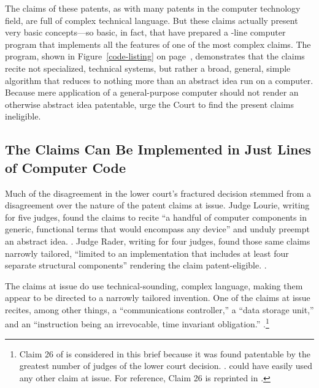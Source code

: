 \documentclass{scotus}
\begin{document}
The claims of these patents, as with many patents in the computer technology
field, are full of complex technical language.
But these claims actually present very basic concepts---so basic, in fact, that
\amici have prepared a \numlines-line computer program
that implements all the features of one of the most complex claims. The program,
shown in Figure~\ref{code-listing} on page~\pageref{code-listing},
demonstrates that the claims recite not specialized, technical systems, but
rather a broad, general, simple algorithm that reduces to nothing more than an
abstract idea run on a computer. Because mere application of a general-purpose
computer should not render an otherwise abstract idea patentable, \amici
urge the Court to find the present claims ineligible.



%
%
\subsection{The Claims Can Be Implemented in Just \Numlines Lines of
Computer Code}

Much of the disagreement in the lower court's fractured decision stemmed
from a disagreement over the nature of the patent claims at issue. Judge Lourie,
writing for five judges,
found the claims to recite ``a handful of
computer components in generic, functional terms that would encompass any
device'' and unduly preempt an abstract idea. .
Judge Rader, writing for four judges, found those same claims narrowly tailored,
``limited to an implementation that includes at least four separate structural
components'' rendering the claim patent-eligible. .

The claims at issue do use technical-sounding, complex language, making them
appear to be directed to a narrowly tailored invention. One of the claims at
issue recites, among other things, a ``communications controller,'' a
``data storage unit,'' and an ``instruction being an irrevocable, time invariant
obligation.'' .\footnote{Claim 26 of
 is considered in this brief because it was found patentable by
the greatest number of judges of the lower court decision. .
\Amici could have easily used any other claim at issue.
For reference, Claim
26 is reprinted in .}
\end{document}
